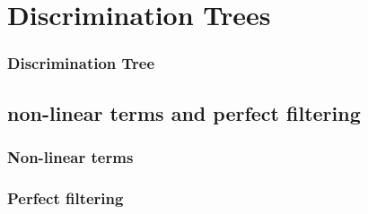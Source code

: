 
\section{Discrimination Trees}

\begin{frame}
	\frametitle{Discrimination Tree}
	
\end{frame}

\begin{frame}
	
\end{frame}

\subsection{non-linear terms and perfect filtering}

\begin{frame}
	\frametitle{Non-linear terms}
	
\end{frame}

\begin{frame}
	
\end{frame}

\begin{frame}
	\frametitle{Perfect filtering}
	
\end{frame}